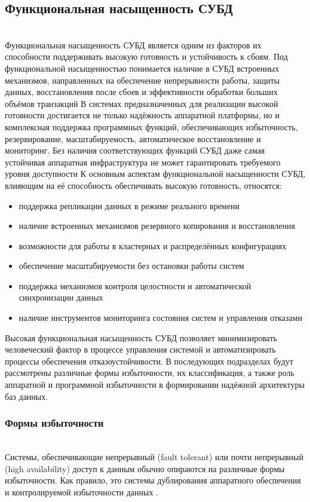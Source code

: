 \subsection{Функциональная насыщенность СУБД} ~\\

Функциональная насыщенность СУБД является одним из факторов их способности поддерживать высокую готовность и устойчивость к сбоям. Под функциональной насыщенностью понимается наличие в СУБД встроенных механизмов, направленных на обеспечение непрерывности работы, защиты данных, восстановления после сбоев и эффективности обработки больших объёмов транзакций \autocite{OszuValduriez}
В системах предназначенных для реализации высокой готовности достигается не только надёжность аппаратной платформы, но и комплексная поддержка программных функций, обеспечивающих избыточность, резервирование, масштабируемость, автоматическое восстановление и мониторинг. Без наличия соответствующих функций СУБД даже самая устойчивая аппаратная инфраструктура не может гарантировать требуемого уровня доступности \autocite{Kleppmann}
К основным аспектам функциональной насыщенности СУБД, влияющим на её способность обеспечивать высокую готовность, относятся:

\begin{itemize}
    \item поддержка репликации данных в режиме реального времени
    \item наличие встроенных механизмов резервного копирования и восстановления
    \item возможности для работы в кластерных и распределённых конфигурациях
    \item обеспечение масштабируемости без остановки работы систем
    \item поддержка механизмов контроля целостности и автоматической синхронизации данных
    \item наличие инструментов мониторинга состояния систем и управления отказами
\end{itemize}

Высокая функциональная насыщенность СУБД позволяет минимизировать человеческий фактор в процессе управления системой и автоматизировать процессы обеспечения отказоустойчивости.
В последующих подразделах будут рассмотрены различные формы избыточности, их классификация, а также роль аппаратной и программной избыточности в формировании надёжной архитектуры баз данных.

\subsubsection{Формы избыточности} ~\\
Системы, обеспечивающие непрерывный (fault tolerant) или почти непрерывный (high availability) доступ к данным обычно опираются на различные формы избыточности.
Как правило, это системы дублирования аппаратного обеспечения и контролируемой избыточности данных \autocite{Baron}.

